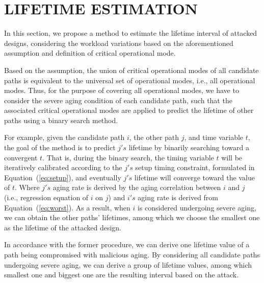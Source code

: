 
\section{LIFETIME ESTIMATION}
\label{sec:lt_estimation}
In this section, we propose a method to estimate the lifetime interval of attacked designs, considering the workload variations based on the aforementioned assumption and definition of critical operational mode.

Based on the assumption, the union of critical operational modes of all candidate paths is equivalent to the universal set of operational modes, i.e., all operational modes. Thus, for the purpose of covering all operational modes, we have to consider the severe aging condition of each candidate path, such that the associated critical operational modes are applied to predict the lifetime of other paths using a binary search method.

For example, given the candidate path $i$, the other path $j$, and time variable $t$, the goal of the method is to predict $j's$ lifetime by binarily searching toward a convergent $t$. That is, during the binary search, the timing variable $t$ will be iteratively calibrated according to the $j's$ setup timing constraint, formulated in Equation~(\ref{eq:setup}), and eventually $j's$ lifetime will converge toward the value of $t$. Where $j's$ aging rate is derived by the aging correlation between $i$ and $j$ (i.e., regression equation of $i$ on $j$) and $i's$ aging rate is derived from Equation~(\ref{eq:worst}). 
As a result, when $i$ is considered undergoing severe aging, we can obtain the other paths' lifetimes, among which we choose the smallest one as the lifetime of the attacked design.

In accordance with the former procedure, we can derive one lifetime value of a path being compromised with malicious aging. By considering all candidate paths undergoing severe aging, we can derive a group of lifetime values, among which smallest one and biggest one are the resulting interval based on the attack.


  
